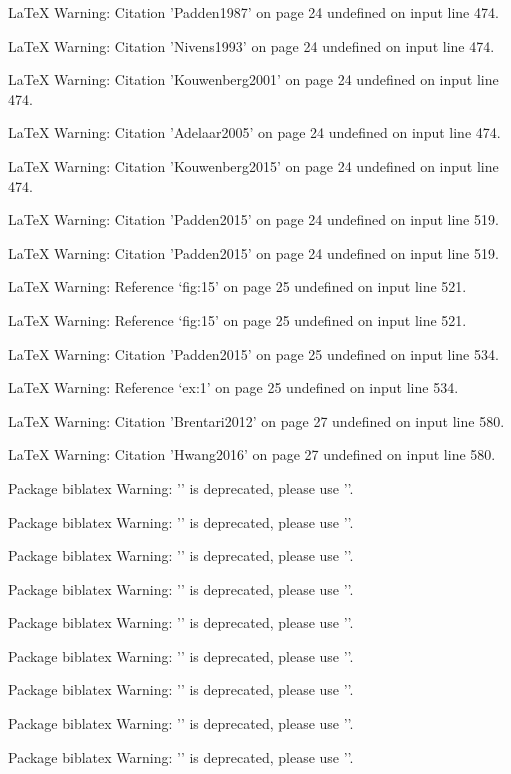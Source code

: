 LaTeX Warning: Citation 'Padden1987' on page 24 undefined on input line 474.


LaTeX Warning: Citation 'Nivens1993' on page 24 undefined on input line 474.


LaTeX Warning: Citation 'Kouwenberg2001' on page 24 undefined on input line 474.


LaTeX Warning: Citation 'Adelaar2005' on page 24 undefined on input line 474.


LaTeX Warning: Citation 'Kouwenberg2015' on page 24 undefined on input line 474.


LaTeX Warning: Citation 'Padden2015' on page 24 undefined on input line 519.


LaTeX Warning: Citation 'Padden2015' on page 24 undefined on input line 519.


LaTeX Warning: Reference `fig:15' on page 25 undefined on input line 521.


LaTeX Warning: Reference `fig:15' on page 25 undefined on input line 521.


LaTeX Warning: Citation 'Padden2015' on page 25 undefined on input line 534.


LaTeX Warning: Reference `ex:1' on page 25 undefined on input line 534.


LaTeX Warning: Citation 'Brentari2012' on page 27 undefined on input line 580.


LaTeX Warning: Citation 'Hwang2016' on page 27 undefined on input line 580.


Package biblatex Warning: '\printdatelabel' is deprecated, please use '\printlabeldate'.


Package biblatex Warning: '\printdatelabel' is deprecated, please use '\printlabeldate'.


Package biblatex Warning: '\printdatelabel' is deprecated, please use '\printlabeldate'.


Package biblatex Warning: '\printdatelabel' is deprecated, please use '\printlabeldate'.


Package biblatex Warning: '\printdatelabel' is deprecated, please use '\printlabeldate'.


Package biblatex Warning: '\printdatelabel' is deprecated, please use '\printlabeldate'.


Package biblatex Warning: '\printdatelabel' is deprecated, please use '\printlabeldate'.


Package biblatex Warning: '\printdatelabel' is deprecated, please use '\printlabeldate'.


Package biblatex Warning: '\printdatelabel' is deprecated, please use '\printlabeldate'.


